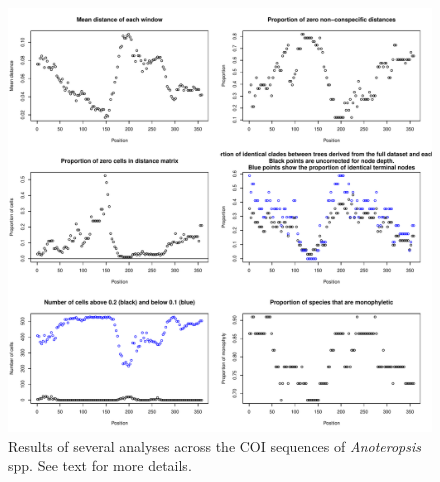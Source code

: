 \documentclass{article}
\begin{document}
\begin{figure}[tbp]
	\includegraphics[width=\textwidth]{slideAnalyses}
	\caption{Results of several analyses across the COI sequences of \emph{Anoteropsis} spp. See text for more details.}
	\label{slideAnalyses.fig}
\end{figure}
\end{document}
